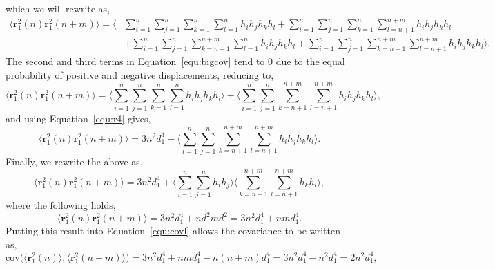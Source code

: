 \documentclass[reprint,superscriptaddress,nobibnotes,amsmath,amssymb,aps,onecolumn]{revtex4-2}
\begin{document}
%
which we will rewrite as, 
%
\begin{equation}
    \begin{aligned}
        \big\langle \mathbf{r}_1^2(n)  \mathbf{r}_1^2(n+m) \big\rangle = \Bigg\langle & \sum_{i=1}^n \sum_{j=1}^n \sum_{k=1}^n \sum_{l=1}^n h_i  h_j h_k h_l + \sum_{i=1}^n \sum_{j=1}^n \sum_{k=1}^n \sum_{l=n+1}^{n+m} h_i  h_j h_k h_l \\ 
        & + \sum_{i=1}^n \sum_{j=1}^n \sum_{k=n+1}^{n+m} \sum_{l=1}^n h_i  h_j h_k h_l + \sum_{i=1}^n \sum_{j=1}^n \sum_{k=n+1}^{n+m} \sum_{l=n+1}^{n+m} h_i  h_j h_k h_l \Bigg\rangle.
    \end{aligned}
    \label{equ:bigcov}
\end{equation}
%
The second and third terms in Equation~\ref{equ:bigcov} tend to \num{0} due to the equal probability of positive and negative displacements, reducing to, 
%
\begin{equation}
    \big\langle \mathbf{r}_1^2(n)  \mathbf{r}_1^2(n+m) \big\rangle = \Bigg\langle \sum_{i=1}^n \sum_{j=1}^n \sum_{k=1}^n \sum_{l=1}^n h_i  h_j h_k h_l \Bigg\rangle + \Bigg\langle \sum_{i=1}^n \sum_{j=1}^n \sum_{k=n+1}^{n+m} \sum_{l=n+1}^{n+m} h_i  h_j h_k h_l \Bigg\rangle,
\end{equation}
%
and using Equation~\ref{equ:r4} gives, 
%
\begin{equation}
    \big\langle \mathbf{r}_1^2(n)  \mathbf{r}_1^2(n+m) \big\rangle = 3n^2d_1^4 + \Bigg\langle \sum_{i=1}^n \sum_{j=1}^n \sum_{k=n+1}^{n+m} \sum_{l=n+1}^{n+m} h_i  h_j h_k h_l \Bigg\rangle.
\end{equation}
%
Finally, we rewrite the above as, 
%
\begin{equation}
    \big\langle \mathbf{r}_1^2(n)  \mathbf{r}_1^2(n+m) \big\rangle = 3n^2d_1^4 + \Bigg\langle \sum_{i=1}^n \sum_{j=1}^n h_i h_j \Bigg\rangle \Bigg\langle \sum_{k=n+1}^{n+m} \sum_{l=n+1}^{n+m} h_k h_l \Bigg\rangle,
\end{equation}
%
where the following holds,
%
\begin{equation}
    \big\langle \mathbf{r}_1^2(n)  \mathbf{r}_1^2(n+m) \big\rangle = 3n^2d_1^4 + nd^2md^2 =  3n^2d_1^4 + nmd_1^4.
\end{equation}
%
Putting this result into Equation~\ref{equ:covl} allows the covariance to be written as, 
%
\begin{equation}
    \mathrm{cov}\Big(\big\langle \mathbf{r}_1^2(n) \big\rangle, \big\langle \mathbf{r}_1^2(n+m) \big\rangle\Big) = 3 n^2 d_1^4 + nmd_1^4 - n(n+m)d_1^4 = 3 n^2 d_1^4 - n^2d_1^4 = 2n^2d_1^4,
\end{equation}
\end{document}
